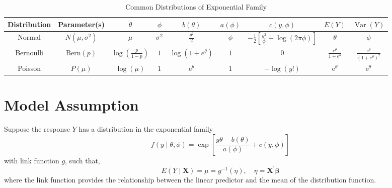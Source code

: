 \begin{table}[hpt]
    \scriptsize
    \centering
    \caption{Common Distributions of Exponential Family}
    \begin{tabular}{ccccccccc}
        \toprule
        Distribution & Parameter(s)      & $\theta$                         & $\phi$       & $b(\theta)$                     & $a(\phi)$ & $c(y,\phi)$                                                   & $E(Y)$                            & $\operatorname{Var}(Y)$                                              \\
        \midrule
        Normal       & $N(\mu,\sigma^2)$ & $\mu$                            & $\sigma^{2}$ & $\frac{\theta^{2}}{2}$          & $\phi$    & $-\frac{1}{2}\left[\frac{y^{2}}{\phi}+\log (2\pi\phi)\right]$ & $\theta$                          & $\phi$                                                               \\
        Bernoulli    & $\text{Bern}(p)$  & $\log\left(\frac{p}{1-p}\right)$ & $1$          & $\log\left(1+e^{\theta}\right)$ & $1$       & $0$                                                           & $\frac{e^{\theta}}{1+e^{\theta}}$ & $\frac{e^{\theta}}{\left(1+e^{\theta}\right)^{2}}$ \\
        Poisson      & $P(\mu)$          & $\log(\mu)$                      & $1$          & $\mathrm{e}^{\theta}$           & $1$       & $-\log(y!)$                                                   & $\mathrm{e}^{\theta}$             & $\mathrm{e}^{\theta}$                                                \\
        \bottomrule
    \end{tabular}
\end{table}

\section{Model Assumption}

Suppose the response $Y$ has a distribution in the exponential family
\begin{equation*}
    f\left(y\mid\theta,\phi\right)=\exp\left[\frac{y\theta-b(\theta)}{a(\phi)}+c(y,\phi)\right]
\end{equation*}
with link function $g$, such that,
\begin{equation}
    E\left(Y\mid\mathbf{X}\right)=\mu=g^{-1}(\eta),\quad\eta=\mathbf{X}^{\prime}\boldsymbol{\beta}
\end{equation}
where the link function provides the relationship between the linear predictor and the mean of the distribution function.

